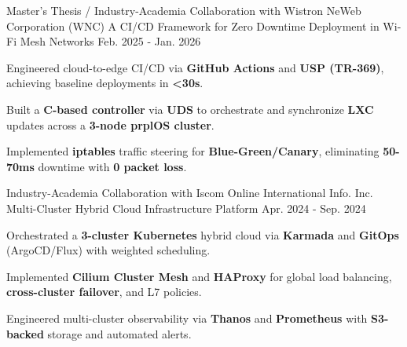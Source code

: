 \vspace{-0.25cm} %

\begin{cventries}


  \cventry
    {Master's Thesis / Industry-Academia Collaboration with Wistron NeWeb Corporation (WNC)} %
    {A CI/CD Framework for Zero Downtime Deployment in Wi-Fi Mesh Networks} %
    {Feb. 2025 - Jan. 2026} %
    {} %
    {
      \begin{cvitems}
        \item {Engineered cloud-to-edge CI/CD via \textbf{GitHub Actions} and \textbf{USP (TR-369)}, achieving baseline deployments in \textbf{<30s}.}
        \item {Built a \textbf{C-based controller} via \textbf{UDS} to orchestrate and synchronize \textbf{LXC} updates across a \textbf{3-node prplOS cluster}.}
        \item {Implemented \textbf{iptables} traffic steering for \textbf{Blue-Green/Canary}, eliminating \textbf{50-70ms} downtime with \textbf{0 packet loss}.}
      \end{cvitems}
    }

  \vspace{0.4cm} %

  \cventry
    {Industry-Academia Collaboration with Iscom Online International Info. Inc.} %
    {Multi-Cluster Hybrid Cloud Infrastructure Platform} %
    {Apr. 2024 - Sep. 2024} %
    {} %
    {
      \begin{cvitems}
        \item {Orchestrated a \textbf{3-cluster Kubernetes} hybrid cloud via \textbf{Karmada} and \textbf{GitOps} (ArgoCD/Flux) with weighted scheduling.}
        \item {Implemented \textbf{Cilium Cluster Mesh} and \textbf{HAProxy} for global load balancing, \textbf{cross-cluster failover}, and L7 policies.}
        \item {Engineered multi-cluster observability via \textbf{Thanos} and \textbf{Prometheus} with \textbf{S3-backed} storage and automated alerts.}
      \end{cvitems}
    }


\end{cventries}
